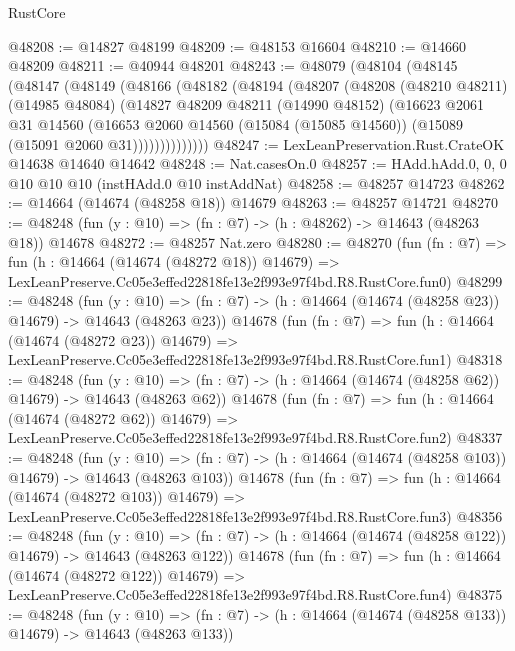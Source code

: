 \begin{lexlean}{RustCore}
\begin{coremodule}
@48208 := @14827 @48199
@48209 := @48153 @16604
@48210 := @14660 @48209
@48211 := @40944 @48201
@48243 := @48079
    (@48104
      (@48145
        (@48147
          (@48149
            (@48166
              (@48182
                (@48194
                  (@48207
                    (@48208
                      (@48210 @48211)
                      (@14985 @48084)
                      (@14827
                        @48209
                        @48211
                        (@14990 @48152)
                        (@16623
                          @2061
                          @31
                          @14560
                          (@16653
                            @2060
                            @14560
                            (@15084 (@15085 @14560))
                            (@15089 (@15091 @2060 @31))))))))))))))
@48247 := LexLeanPreservation.Rust.CrateOK @14638 @14640 @14642
@48248 := Nat.casesOn.{0}
@48257 := HAdd.hAdd.{0, 0, 0} @10 @10 @10 (instHAdd.{0} @10 instAddNat)
@48258 := @48257 @14723
@48262 := @14664 (@14674 (@48258 @18)) @14679
@48263 := @48257 @14721
@48270 := @48248 (fun (y : @10) => (fn : @7) -> (h : @48262) -> @14643 (@48263 @18)) @14678
@48272 := @48257 Nat.zero
@48280 := @48270
    (fun (fn : @7) =>
    fun (h : @14664 (@14674 (@48272 @18)) @14679) =>
    LexLeanPreserve.Cc05e3effed22818fe13e2f993e97f4bd.R8.RustCore.fun0)
@48299 := @48248
    (fun (y : @10) => (fn : @7) -> (h : @14664 (@14674 (@48258 @23)) @14679) -> @14643 (@48263 @23))
    @14678
    (fun (fn : @7) =>
    fun (h : @14664 (@14674 (@48272 @23)) @14679) =>
    LexLeanPreserve.Cc05e3effed22818fe13e2f993e97f4bd.R8.RustCore.fun1)
@48318 := @48248
    (fun (y : @10) => (fn : @7) -> (h : @14664 (@14674 (@48258 @62)) @14679) -> @14643 (@48263 @62))
    @14678
    (fun (fn : @7) =>
    fun (h : @14664 (@14674 (@48272 @62)) @14679) =>
    LexLeanPreserve.Cc05e3effed22818fe13e2f993e97f4bd.R8.RustCore.fun2)
@48337 := @48248
    (fun (y : @10) =>
    (fn : @7) -> (h : @14664 (@14674 (@48258 @103)) @14679) -> @14643 (@48263 @103))
    @14678
    (fun (fn : @7) =>
    fun (h : @14664 (@14674 (@48272 @103)) @14679) =>
    LexLeanPreserve.Cc05e3effed22818fe13e2f993e97f4bd.R8.RustCore.fun3)
@48356 := @48248
    (fun (y : @10) =>
    (fn : @7) -> (h : @14664 (@14674 (@48258 @122)) @14679) -> @14643 (@48263 @122))
    @14678
    (fun (fn : @7) =>
    fun (h : @14664 (@14674 (@48272 @122)) @14679) =>
    LexLeanPreserve.Cc05e3effed22818fe13e2f993e97f4bd.R8.RustCore.fun4)
@48375 := @48248
    (fun (y : @10) =>
    (fn : @7) -> (h : @14664 (@14674 (@48258 @133)) @14679) -> @14643 (@48263 @133))

\end{coremodule}
\end{lexlean}
